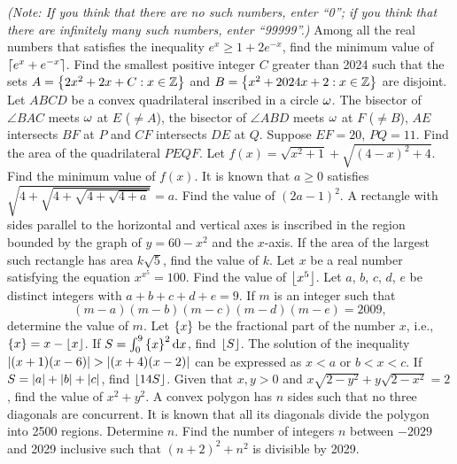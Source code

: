 \begin{enumerate}
    \textit{(Note: If you think that there are no such numbers, enter ``0''; if you think that there are infinitely many such numbers, enter ``99999''.)}
    \hyperrefitem[A::2024-O-1-5] Among all the real numbers that satisfies the inequality $e^x \geq 1 + 2e^{-x}$, find the minimum value of $\left\lceil e^x + e^{-x} \right\rceil$.
    \hyperrefitem[A::2024-O-1-6] Find the smallest positive integer $C$ greater than 2024 such that the sets $A = \left\lbrace 2x^2 + 2x + C : x \in \mathbb{Z} \right\rbrace$ and $B = \left\lbrace x^2 + 2024x + 2: x \in \mathbb{Z} \right\rbrace$ are disjoint.
    \hyperrefitem[A::2024-O-1-7] Let $ABCD$ be a convex quadrilateral inscribed in a circle $\omega$. The bisector of $\angle BAC$ meets $\omega$ at $E$ ($\neq A$), the bisector of $\angle ABD$ meets $\omega$ at $F$ ($\neq B$), $AE$ intersects $BF$ at $P$ and $CF$ intersects $DE$ at $Q$. Suppose $EF = 20$, $PQ = 11$. Find the area of the quadrilateral $PEQF$.
    \hyperrefitem[A::2024-O-1-8] Let $f(x) = \sqrt{x^2 + 1} + \sqrt{(4-x)^2 + 4}$. Find the minimum value of $f(x)$.
    \hyperrefitem[A::2024-O-1-9] It is known that $a \geq 0$ satisfies $\sqrt{4 + \sqrt{4 + \sqrt{4 + \sqrt{4 + a}}}} = a$. Find the value of $(2a - 1)^2$.
    \hyperrefitem[A::2024-O-1-10] A rectangle with sides parallel to the horizontal and vertical axes is inscribed in the region bounded by the graph of $y = 60 - x^2$ and the $x$-axis. If the area of the largest such rectangle has area $k\sqrt 5$, find the value of $k$.
    \hyperrefitem[A::2024-O-1-11] Let $x$ be a real number satisfying the equation $x^{x^5} = 100$. Find the value of $\left\lfloor x^5 \right\rfloor$.
    \hyperrefitem[A::2024-O-1-12] Let $a$, $b$, $c$, $d$, $e$ be distinct integers with $a + b + c + d + e = 9$. If $m$ is an integer such that \[(m-a)(m-b)(m-c)(m-d)(m-e) = 2009,\] determine the value of $m$.
    \hyperrefitem[A::2024-O-1-13] Let $\left\lbrace x \right\rbrace$ be the fractional part of the number $x$, i.e., $\left\lbrace x \right\rbrace = x - \left\lfloor x \right\rfloor$. If $S = \int_0^9 \left\lbrace x \right\rbrace^2 \mathop{\mathrm{d}x}$, find $\left\lfloor S \right\rfloor$.
    \hyperrefitem[A::2024-O-1-14] The solution of the inequality $\left\lvert (x+1)(x-6) \right\rvert > \left\lvert (x+4)(x-2) \right\rvert$ can be expressed as $x < a$ or $b < x < c$. If $S = \left\lvert a \right\rvert + \left\lvert b \right\rvert + \left\lvert c \right\rvert$, find $\left\lfloor 14S \right\rfloor$.
    \hyperrefitem[A::2024-O-1-15]Given that $x, y > 0$ and $x\sqrt{2-y^2} + y\sqrt{2-x^2} = 2$, find the value of $x^2 + y^2$.
    \hyperrefitem[A::2024-O-1-16] A convex polygon has $n$ sides such that no three diagonals are concurrent. It is known that all its diagonals divide the polygon into 2500 regions. Determine $n$.
    \hyperrefitem[A::2024-O-1-17] Find the number of integers $n$ between $-2029$ and 2029 inclusive such that $(n+2)^2 + n^2$ is divisible by 2029.

\end{enumerate}
